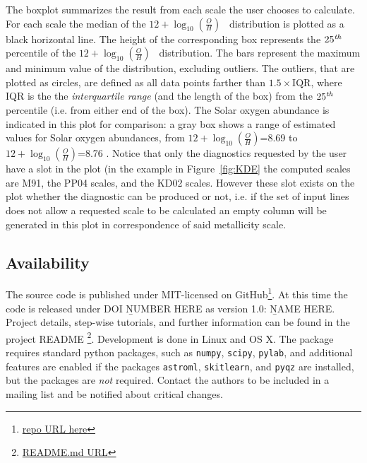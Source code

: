 \documentclass{emulateapj}
\newcommand{\oxab}{\ensuremath{12 + \log_{10}(\frac{O}{H})}}
\begin{document}
The boxplot summarizes the result from each scale the user chooses to calculate. For each scale the median of the \oxab~ distribution is plotted as a black horizontal line. The height of the corresponding box represents the $25^\mathrm{\emph{th}}$ percentile of the \oxab~ distribution. 
The bars represent the maximum and minimum value of the distribution, excluding outliers. The outliers, that are plotted as circles, are defined as all data points farther than  $1.5\times\mathrm{IQR}$, where IQR is the the \emph{interquartile range} (and the length of the box) from the $25^\mathrm{\emph{th}}$ percentile (i.e. from either end of the box). 
The Solar oxygen abundance is indicated in this plot for comparison: a gray box shows a range of estimated values for Solar oxygen abundances, from \oxab=8.69 \citep{asplund09_rev} to \oxab=8.76 \citep{chaffau11}.
Notice that only the diagnostics requested by the user have a slot in the plot (in the example in Figure~\ref{fig:KDE} the computed scales are M91, the PP04 scales, and the KD02 scales. However these slot exists on the plot whether the diagnostic can be produced or not, i.e. if the set of input lines does not allow a requested scale to be calculated an empty column will be generated in this plot in correspondence of said metallicity scale.





\subsection{Availability}
The source code is published under MIT-licensed on GitHub\footnote{\url{repo URL here}}. At this time the code is released under DOI {\b NUMBER HERE} as version 1.0: {\b NAME HERE}. Project
details, step-wise tutorials, and further information can be found in the project README \footnote{\url{README.md URL}}.
Development is done in Linux and OS X. The package requires standard python packages, such as \verb=numpy=, \verb=scipy=, \verb=pylab=, and additional features are enabled if the packages \verb=astroml=, \verb=skitlearn=, and \verb=pyqz= are installed, but the packages are \emph{not} required. Contact the authors to be included in a mailing list and be notified about critical changes. 
\end{document}
